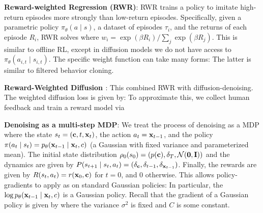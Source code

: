 \documentclass{article}
\begin{document}
  \textbf{Reward-weighted Regression (RWR)}: RWR trains a policy to imitate high-return episodes more strongly than low-return episodes. Specifically, given a parametric policy $\pi_\theta(a\mid s)$, a dataset of episodes $\tau_i$, and the returns of each episode $R_i$, RWR solves
  where $w_i=\exp(\beta R_i)/\sum_{j} \exp(\beta R_j)$. This is similar to offline RL, except in diffusion models we do not have access to $\pi_\theta(a_{i,t}\mid s_{i,t})$. The specific weight function can take many forms:
  The latter is similar to filtered behavior cloning.

  \textbf{Reward-Weighted Diffusion \cite{lee2023aligning}}: This combined RWR with diffusion-denoising. The weighted diffusion loss is given by:
  To approximate this, we collect human feedback and train a reward model via

  \textbf{Denoising as a multi-step MDP}: We treat the process of denoising as a MDP where the state $s_t=(\mathbf{c},t,\mathbf{x}_t)$, the action $a_t=\mathbf{x}_{t-1}$, and the policy $\pi(a_t\mid s_t)=p_\theta(\mathbf{x} _{t-1}\mid \mathbf{x}_t,c)$ (a Gaussian with fixed variance and parameterized mean). The initial state distribution $\rho_0(s_0)=(p(\mathbf{c}),\delta_T,\mathcal{N}(\textbf{0},\mathbf{I}))$ and the dynamics are given by $P(s_{t+1}\mid s_t,a_t)=(\delta_{\mathbf{c}},\delta_{t-1},\delta_{\mathbf{x}_{t-1}})$. Finally, the rewards are given by $R(s_t,a_t)=r(\mathbf{x}_0,\mathbf{c})$ for $t=0$, and $0$ otherwise. This allows policy-gradients to apply as on standard Gaussian policies:
  In particular, the $\log p_\theta(\mathbf{x}_{t-1}\mid \mathbf{x}_t,c)$ is a Gaussian policy. Recall that the gradient of a Gaussian policy is given by 
  where the variance $\sigma^2$ is fixed and $C$ is some constant.
\end{document}
